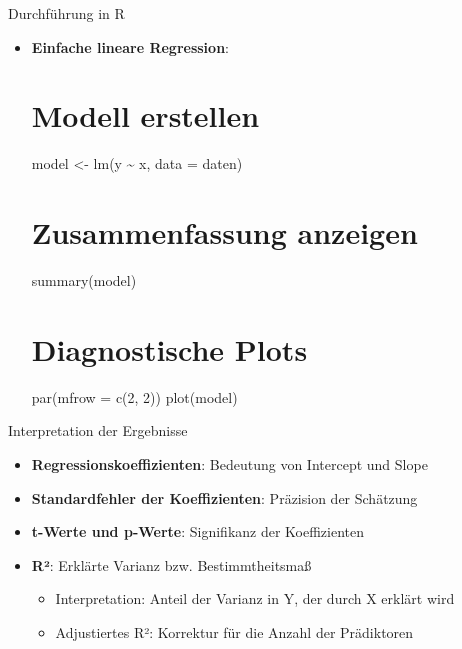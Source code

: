 \documentclass[
  ignorenonframetext,
]{beamer}
\providecommand{\tightlist}{%
  \setlength{\itemsep}{0pt}\setlength{\parskip}{0pt}}
\begin{document}
\begin{frame}{Durchführung in R}
\protect{}\label{durchfuxfchrung-in-r-1}
\begin{itemize}
\item
  \textbf{Einfache lineare Regression}:

  \section{Modell erstellen}\label{modell-erstellen}

  model \textless- lm(y \textasciitilde{} x, data = daten)

  \section{Zusammenfassung anzeigen}\label{zusammenfassung-anzeigen}

  summary(model)

  \section{Diagnostische Plots}\label{diagnostische-plots}

  par(mfrow = c(2, 2)) plot(model)
\end{itemize}
\end{frame}

\begin{frame}{Interpretation der Ergebnisse}
\protect{}\label{interpretation-der-ergebnisse}
\begin{itemize}
\tightlist
\item
  \textbf{Regressionskoeffizienten}: Bedeutung von Intercept und Slope
\item
  \textbf{Standardfehler der Koeffizienten}: Präzision der Schätzung
\item
  \textbf{t-Werte und p-Werte}: Signifikanz der Koeffizienten
\item
  \textbf{R²}: Erklärte Varianz bzw. Bestimmtheitsmaß

  \begin{itemize}
  \tightlist
  \item
    Interpretation: Anteil der Varianz in Y, der durch X erklärt wird
  \item
    Adjustiertes R²: Korrektur für die Anzahl der Prädiktoren
  \end{itemize}
\end{itemize}
\end{frame}
\end{document}
